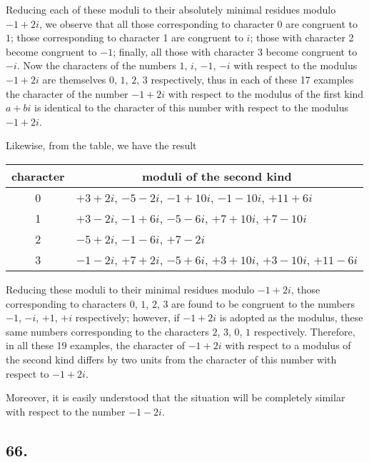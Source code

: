 \documentclass[twoside,12pt]{memoir}
\begin{document}
Reducing each of these moduli to their absolutely minimal residues modulo \(-1+2 i\), we observe that all those corresponding to character \(0\) are congruent to \(1\); those corresponding to character 1 are congruent to \(i\); those with character 2 become congruent to \(-1\); finally, all those with character 3 become congruent to \(-i\). Now the characters of the numbers \(1\), \(i\), \(-1\), \(-i\) with respect to the modulus \(-1+2 i\) are themselves \(0\), \(1\), \(2\), \(3\) respectively, thus in each of these 17 examples the character of the number \(-1+2 i\) with respect to the modulus of the first kind \(a+b i\) is identical to the character of this number with respect to the modulus \(-1+2 i\).
%

Likewise, from the table, we have the result
\begin{center}
\begin{tabular}{c|l}
character & \multicolumn{1}{c}{moduli of the second kind} \\
\hline
0 & \(+3+2 i\), \(-5-2 i\), \(-1+10 i\), \(-1-10 i\), \(+11+6 i\) \\
1 & \(+3-2 i\), \(-1+6 i\), \(-5-6 i\), \(+7+10 i\), \(+7-10 i\) \\
2 & \(-5+2 i\), \(-1-6 i\), \(+7-2 i\) \\
3 & \(-1-2 i\), \(+7+2 i\), \(-5+6 i\), \(+3+10 i\), \(+3-10 i\), \(+11-6 i\) \\
\end{tabular}
\end{center}
 
Reducing these moduli to their minimal residues modulo \(-1+2 i\), those corresponding to characters \(0\), \(1\), \(2\), \(3\) are found to be congruent to the numbers \(-1\), \(-i\), \(+1\), \(+i\) respectively; however, if \(-1+2 i\) is adopted as the modulus, these same numbers corresponding to the characters \(2\), \(3\), \(0\), \(1\) respectively. Therefore, in all these 19 examples, the character of \(-1+2 i\) with respect to a modulus of the second kind differs by two units from the character of this number with respect to \(-1+2 i\).
 
Moreover, it is easily understood that the situation will be completely similar with respect to the number \(-1-2 i\).
%

\subsection*{66.}
\end{document}
